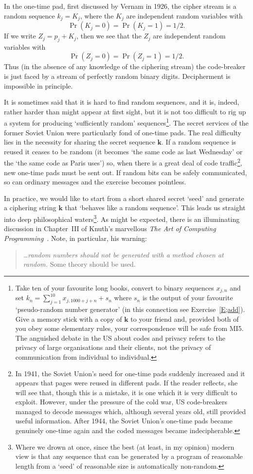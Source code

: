 In the one-time pad, first discussed by
Vernam in 1926, the cipher stream is a random
sequence $k_{j}=K_{j}$, where the $K_{j}$ are
independent random variables with
\[\Pr(K_{j}=0)=\Pr(K_{j}=1)=1/2.\]
If we write $Z_{j}=p_{j}+K_{j}$, then we see that
the $Z_{j}$ are
independent random variables with
\[\Pr(Z_{j}=0)=\Pr(Z_{j}=1)=1/2.\]
Thus (in the absence of any knowledge of the ciphering stream)
the code-breaker is just faced by a stream of
perfectly random binary digits. Decipherment
is impossible in principle.

It is sometimes said that it is hard to find
random sequences, and it is, indeed, rather harder
than might appear at first sight, but it is
not too difficult to rig up a system for producing
`sufficiently random' sequences\footnote{Take ten
of your favourite long books, convert to
binary sequences $x_{j,n}$ and set
$k_{n}=\sum_{j=1}^{10}x_{j,1000+j+n}+s_{n}$
where $s_{n}$ is the output of your favourite
`pseudo-random number generator'
(in this connection see Exercise~\ref{E;add}). Give a memory stick
with a copy of ${\mathbf k}$ to your friend
and, provided both of you obey some elementary rules,
your correspondence
will be safe from MI5. The anguished debate in the US
about codes and
privacy refers to the privacy of large organisations
and their clients, not the privacy of communication
from individual to individual.}.
The secret
services of the former Soviet Union were
particularly fond of one-time 
pads. 
The real
difficulty lies in the necessity for sharing
the secret sequence ${\mathbf k}$. If a random sequence
is reused it ceases to be random (it becomes
`the same code as last Wednesday' or the
`the same code as Paris uses') so, when
there is a great deal of code traffic\footnote{In 1941, 
the Soviet Union's
need for one-time pads suddenly
increased and it appears that pages were reused
in different pads. If the reader reflects, she will see that,
though this is a mistake, 
it is one which it is very difficult to exploit.
However, under the pressure of the cold war, US code-breakers
managed to decode messages which, although several years old,
still provided useful information. After 1944, the Soviet Union's
one-time pads became genuinely one-time again and the
coded messages became indecipherable.}, new
one-time pads must be sent out.
If random bits can be safely communicated,
so can ordinary messages and the exercise
becomes pointless.

In practice, we would like to start from a short
shared secret `seed' and generate a ciphering
string ${\mathbf k}$ that `behaves like a random
sequence'. This leads us straight into deep
philosophical waters\footnote{Where we drown
at once, since the best (at least, in
my opinion)
modern view is that any sequence that can be generated
by a program of reasonable length from a `seed'
of reasonable size is automatically non-random.}.
As might be expected, there is an illuminating
discussion in Chapter~III
of Knuth's marvellous \emph{The Art of
Computing Programming}~\cite{Knuth}.
Note, in particular, his warning:
\begin{quote} \emph{\dots random numbers
should not be generated with a method chosen at
random.} Some theory should be used.
\end{quote}

